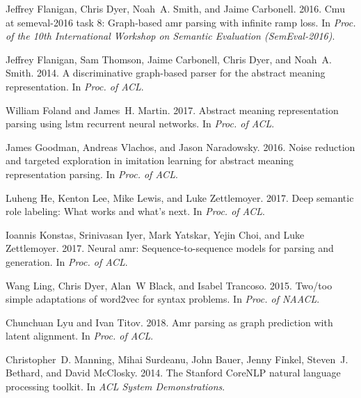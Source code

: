 \documentclass[11pt,a4paper]{article}
\begin{document}
\begin{thebibliography}{30}
	Jeffrey Flanigan, Chris Dyer, Noah~A. Smith, and Jaime Carbonell. 2016.
	\newblock Cmu at semeval-2016 task 8: Graph-based amr parsing with infinite
	ramp loss.
	\newblock In \emph{Proc. of the 10th International Workshop on Semantic
		Evaluation (SemEval-2016)}.
	
	Jeffrey Flanigan, Sam Thomson, Jaime Carbonell, Chris Dyer, and Noah~A. Smith.
	2014.
	\newblock A discriminative graph-based parser for the abstract meaning
	representation.
	\newblock In \emph{Proc. of ACL}.
	
	William Foland and James~H. Martin. 2017.
	\newblock Abstract meaning representation parsing using lstm recurrent neural
	networks.
	\newblock In \emph{Proc. of ACL}.
	
	James Goodman, Andreas Vlachos, and Jason Naradowsky. 2016.
	\newblock Noise reduction and targeted exploration in imitation learning for
	abstract meaning representation parsing.
	\newblock In \emph{Proc. of ACL}.
	
	Luheng He, Kenton Lee, Mike Lewis, and Luke Zettlemoyer. 2017.
	\newblock Deep semantic role labeling: What works and what’s next.
	\newblock In \emph{Proc. of ACL}.
	
	Ioannis Konstas, Srinivasan Iyer, Mark Yatskar, Yejin Choi, and Luke
	Zettlemoyer. 2017.
	\newblock Neural amr: Sequence-to-sequence models for parsing and generation.
	\newblock In \emph{Proc. of ACL}.
	
	Wang Ling, Chris Dyer, Alan~W Black, and Isabel Trancoso. 2015.
	\newblock Two/too simple adaptations of word2vec for syntax problems.
	\newblock In \emph{Proc. of NAACL}.
	
	Chunchuan Lyu and Ivan Titov. 2018.
	\newblock Amr parsing as graph prediction with latent alignment.
	\newblock In \emph{Proc. of ACL}.
	
	Christopher~D. Manning, Mihai Surdeanu, John Bauer, Jenny Finkel, Steven~J.
	Bethard, and David McClosky. 2014.
	\newblock The {Stanford} {CoreNLP} natural language processing toolkit.
	\newblock In \emph{ACL System Demonstrations}.
	

\end{thebibliography}
\end{document}
